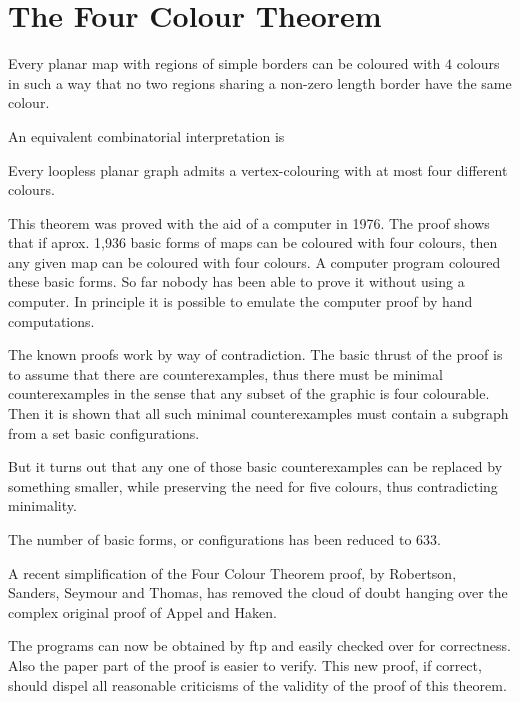 \section{The Four Colour Theorem}

\bigskip

\begin{teo}
    Every planar map with regions of simple borders can be coloured
    with $4$ colours in such a way that no two regions sharing a non-zero
    length border have the same colour.
\end{teo}

An equivalent combinatorial interpretation is
\begin{teo}
Every loopless planar graph admits a vertex-colouring with at most four 
different colours.
\end{teo}

    This theorem was proved with the aid of a computer in 1976.
    The proof shows that if aprox. 1,936  basic forms of maps
    can be coloured with four colours, then any given map can be
    coloured with four colours. A computer program coloured these
    basic forms. So far nobody has been able to prove it without
    using a computer. In principle it is possible to emulate the
    computer proof by hand computations.

    The known proofs work by way of contradiction. The basic thrust 
    of the proof 
    is to assume that there are counterexamples, thus there must
    be minimal counterexamples in the sense that any subset of the
    graphic is four colourable. Then it is shown that all such 
    minimal counterexamples must contain a subgraph from a set basic 
    configurations. 

    But it turns out that any one of those basic counterexamples 
    can  be replaced by something smaller, while preserving the
    need for five colours, thus contradicting minimality.

    The number of basic forms, or configurations has been reduced to
    633.     

    A recent simplification of the Four Colour Theorem proof,
    by Robertson, Sanders, Seymour and Thomas, has removed the cloud
    of doubt hanging over the complex original proof of Appel and 
    Haken.

    The programs can now be obtained by ftp and easily checked over
    for correctness. Also the paper part of the proof is easier to
    verify. This new proof, if correct, should dispel all 
    reasonable criticisms of the validity of the proof of this
    theorem.


